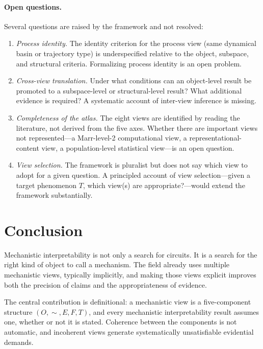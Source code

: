 \documentclass[11pt]{article}
\theoremstyle{remark}
\begin{document}
\paragraph{Open questions.}
Several questions are raised by the framework and not resolved:
\begin{enumerate}[leftmargin=*]
\item \emph{Process identity.}  The identity criterion for the process
      view (same dynamical basin or trajectory type) is underspecified
      relative to the object, subspace, and structural criteria.
      Formalizing process identity is an open problem.
\item \emph{Cross-view translation.}  Under what conditions can an
      object-level result be promoted to a subspace-level or structural-level
      result?  What additional evidence is required?  A systematic account
      of inter-view inference is missing.
\item \emph{Completeness of the atlas.}  The eight views are identified
      by reading the literature, not derived from the five axes.  Whether
      there are important views not represented---a Marr-level-2 computational
      view, a representational-content view, a population-level statistical
      view---is an open question.
\item \emph{View selection.}  The framework is pluralist but does not
      say which view to adopt for a given question.  A principled account
      of view selection---given a target phenomenon $T$, which view(s)
      are appropriate?---would extend the framework substantially.
\end{enumerate}

\section{Conclusion}

Mechanistic interpretability is not only a search for circuits.  It is
a search for the right kind of object to call a mechanism.  The field
already uses multiple mechanistic views, typically implicitly, and making
those views explicit improves both the precision of claims and the
appropriateness of evidence.

The central contribution is definitional: a mechanistic view is a
five-component structure $(O, {\sim}, E, F, T)$, and every
mechanistic interpretability result assumes one, whether or not it is
stated.  Coherence between the components is not automatic, and incoherent
views generate systematically unsatisfiable evidential demands.
\end{document}
